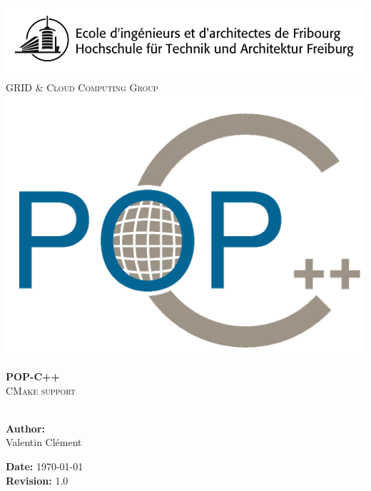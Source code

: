 
\begin{titlepage}
 
\begin{center}
\includegraphics[scale=0.3]{logo_eif.png}\\[1.5cm]
\textsc{\LARGE GRID \& Cloud Computing Group}\\[1.5cm]

\includegraphics[scale=0.3]{pic/logo_pop.png}\\[2cm]


\HRule \\[1cm]
{ \huge \bfseries POP-C++}\\[0.5cm]
\textsc{\LARGE CMake support}\\[1cm]
 
\HRule \\[5cm]
 
\begin{minipage}{0.4\textwidth}
\begin{flushleft} \large
\textbf{Author:}\\
Valentin Clément
\end{flushleft}
\end{minipage}
\begin{minipage}{0.4\textwidth}
\begin{flushright} \large
\textbf{Date:} \today \\

\textbf{Revision:} 1.0
\end{flushright}
\end{minipage}
 
\vfill
  
\end{center}
 
\end{titlepage}
